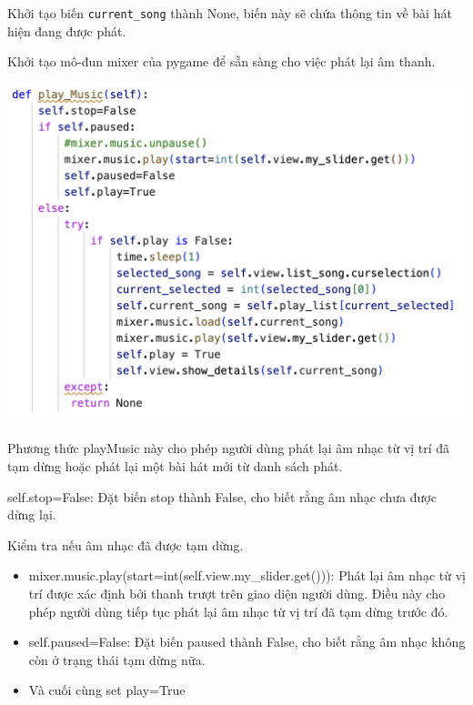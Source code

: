 \documentclass[a4paper]{article}
\begin{document}
\hspace*{0.5} Khởi tạo biến \texttt{current\_song} thành None, biến này sẽ chứa thông tin về bài hát hiện đang được phát.

\hspace*{0.5} Khởi tạo mô-đun mixer của pygame để sẵn sàng cho việc phát lại âm thanh.

\begin{center}
\includegraphics[width=175mm]{template_SGU 2/audio_playMusic.png}
\end{center}

\hspace*{0.5} Phương thức playMusic này cho phép người dùng phát lại âm nhạc từ vị trí đã tạm dừng hoặc phát lại một bài hát mới từ danh sách phát.

\hspace*{0.5} self.stop=False: Đặt biến stop thành False, cho biết rằng âm nhạc chưa được dừng lại.

\hspace*{0.5} Kiểm tra nếu âm nhạc đã được tạm dừng.
\begin{itemize}
    \item mixer.music.play(start=int(self.view.my\_slider.get())): Phát lại âm nhạc từ vị trí được xác định bởi thanh trượt trên giao diện người dùng. Điều này cho phép người dùng tiếp tục phát lại âm nhạc từ vị trí đã tạm dừng trước đó.
    \item self.paused=False: Đặt biến paused thành False, cho biết rằng âm nhạc không còn ở trạng thái tạm dừng nữa.
    \item Và cuối cùng set play=True
\end{itemize}
\end{document}
